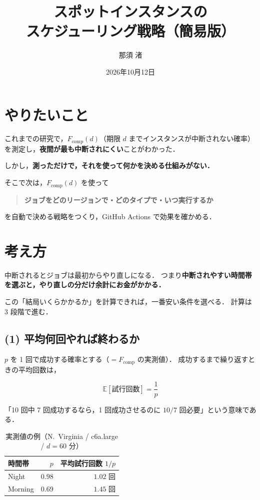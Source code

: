 \documentclass[11pt,a4paper]{ltjsarticle}
\title{スポットインスタンスの\\スケジューリング戦略（簡易版）}
\author{那須 渚}
\date{2026年10月12日}
\newcommand{\Fcomp}{F_{\mathrm{comp}}}
\newcommand{\E}{\mathbb{E}}
\begin{document}
\maketitle

\section{やりたいこと}

これまでの研究で，$\Fcomp(d)$（期限 $d$ までインスタンスが中断されない確率）
を測定し，\textbf{夜間が最も中断されにくい}ことがわかった．

しかし，\textbf{測っただけで，それを使って何かを決める仕組みがない．}

そこで次は，$\Fcomp(d)$ を使って

\begin{quote}
\textbf{ジョブをどのリージョンで・どのタイプで・いつ実行するか}
\end{quote}

を自動で決める戦略をつくり，GitHub Actions で効果を確かめる．

\section{考え方}

中断されるとジョブは最初からやり直しになる．
つまり\textbf{中断されやすい時間帯を選ぶと，やり直しの分だけ余計にお金がかかる．}

この「結局いくらかかるか」を計算できれば，一番安い条件を選べる．
計算は 3 段階で進む．

\subsection{(1) 平均何回やれば終わるか}

$p$ を 1 回で成功する確率とする（$= \Fcomp$ の実測値）．
成功するまで繰り返すときの平均回数は，

\begin{equation}
\E[\text{試行回数}] = \frac{1}{p}
\end{equation}

「10 回中 7 回成功するなら，1 回成功させるのに $10/7$ 回必要」という意味である．

\begin{table}[htbp]
\centering
\caption{実測値の例（N.~Virginia / c6a.large / $d = 60$ 分）}
\begin{tabular}{@{}lrr@{}}
\toprule
時間帯 & $p$ & 平均試行回数 $1/p$ \\
\midrule
Night   & $0.98$ & $1.02$ 回 \\
Morning & $0.69$ & $1.45$ 回 \\
\bottomrule
\end{tabular}
\end{table}
\end{document}

